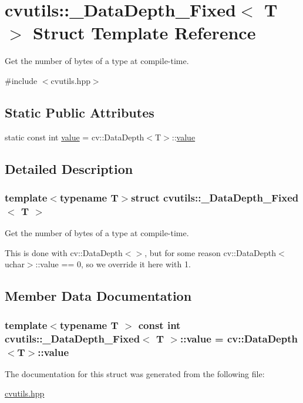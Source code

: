 \hypertarget{structcvutils_1_1___data_depth___fixed}{\section{cvutils\-:\-:\-\_\-\-Data\-Depth\-\_\-\-Fixed$<$ T $>$ Struct Template Reference}
\label{structcvutils_1_1___data_depth___fixed}
}


Get the number of bytes of a type at compile-\/time.  




{\ttfamily \#include $<$cvutils.\-hpp$>$}

\subsection*{Static Public Attributes}
\begin{DoxyCompactItemize}
\item 
static const int \hyperlink{structcvutils_1_1___data_depth___fixed_abecf0b84192c9548f8ace31b11c64618}{value} = cv\-::\-Data\-Depth$<$T$>$\-::\hyperlink{structcvutils_1_1___data_depth___fixed_abecf0b84192c9548f8ace31b11c64618}{value}
\end{DoxyCompactItemize}


\subsection{Detailed Description}
\subsubsection*{template$<$typename T$>$struct cvutils\-::\-\_\-\-Data\-Depth\-\_\-\-Fixed$<$ T $>$}

Get the number of bytes of a type at compile-\/time. 

This is done with {\ttfamily cv\-::\-Data\-Depth$<$$>$}, but for some reason {\ttfamily cv\-::\-Data\-Depth$<$uchar$>$\-::value} == 0, so we override it here with 1. 

\subsection{Member Data Documentation}
\hypertarget{structcvutils_1_1___data_depth___fixed_abecf0b84192c9548f8ace31b11c64618}{
\subsubsection[{value}]{\setlength{\rightskip}{0pt plus 5cm}template$<$typename T $>$ const int {\bf cvutils\-::\-\_\-\-Data\-Depth\-\_\-\-Fixed}$<$ T $>$\-::{\bf value} = cv\-::\-Data\-Depth$<$T$>$\-::{\bf value}}}\label{structcvutils_1_1___data_depth___fixed_abecf0b84192c9548f8ace31b11c64618}


The documentation for this struct was generated from the following file\-:\begin{DoxyCompactItemize}
\item 
\hyperlink{cvutils_8hpp}{cvutils.\-hpp}\end{DoxyCompactItemize}
